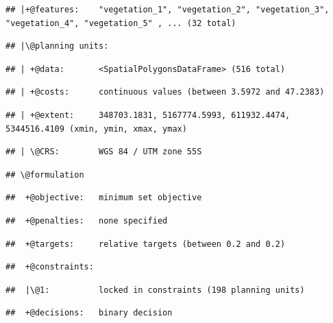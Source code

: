 \documentclass[
  12pt,
]{book}
\begin{document}
\begin{verbatim}
## |+@features:    "vegetation_1", "vegetation_2", "vegetation_3", "vegetation_4", "vegetation_5" , ... (32 total)
\end{verbatim}

\begin{verbatim}
## |\@planning units:
\end{verbatim}

\begin{verbatim}
## | +@data:       <SpatialPolygonsDataFrame> (516 total)
\end{verbatim}

\begin{verbatim}
## | +@costs:      continuous values (between 3.5972 and 47.2383)
\end{verbatim}

\begin{verbatim}
## | +@extent:     348703.1831, 5167774.5993, 611932.4474, 5344516.4109 (xmin, ymin, xmax, ymax)
\end{verbatim}

\begin{verbatim}
## | \@CRS:        WGS 84 / UTM zone 55S
\end{verbatim}

\begin{verbatim}
## \@formulation
\end{verbatim}

\begin{verbatim}
##  +@objective:   minimum set objective
\end{verbatim}

\begin{verbatim}
##  +@penalties:   none specified
\end{verbatim}

\begin{verbatim}
##  +@targets:     relative targets (between 0.2 and 0.2)
\end{verbatim}

\begin{verbatim}
##  +@constraints:
\end{verbatim}

\begin{verbatim}
##  |\@1:          locked in constraints (198 planning units)
\end{verbatim}

\begin{verbatim}
##  +@decisions:   binary decision
\end{verbatim}
\end{document}
